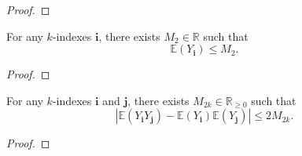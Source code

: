 \begin{proof}
\end{proof}
\begin{lemma}[R-2-16]
  \label{} %
  For any $k$-indexes $\mathbf{i}$, there exists $M_2 \in \mathbb{R}$ such that
  \[
  \mathbb{E} (Y_\mathbf{i}) \leq M_2.
  \]
\end{lemma}
\begin{proof}
\end{proof}
\begin{lemma}[R-2-17]
  \label{} %
  \uses{} %
  For any $k$-indexes $\mathbf{i}$ and $\mathbf{j}$, there exists $M_{2k} \in \mathbb{R}_{\geq 0}$ such that
  \[
  | \mathbb{E} (Y_\mathbf{i}Y_\mathbf{j}) -  \mathbb{E}(Y_\mathbf{i}) \mathbb{E}(Y_\mathbf{j}) |
  \leq 2 M_{2k}.
  \] 
\end{lemma}
\begin{proof}
\end{proof}





\iffalse
\begin{definition}
  \label{}
  \uses{}%

\end{definition}
\begin{lemma}
  \label{}
  \uses{}
\end{lemma}
\begin{proof}
\end{proof}
\fi